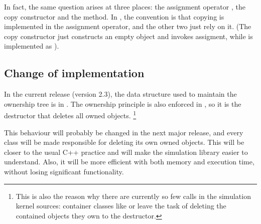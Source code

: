 In fact, the same question arises at three places:
the assignment operator , the copy constructor
and the  method.
In {\opp}, the convention is that copying is implemented
in the assignment operator, and the other two just rely on it.
(The copy constructor just constructs an empty object and
invokes assigment, while 
is implemented as ).

%
%
%
%
%
%
%
%
%

\subsection{Change of implementation}

In the current release (version 2.3), the data structure
used to maintain the ownership tree is in .
The ownership principle is also enforced in ,
so it is the  destructor that deletes all owned objects.
  \footnote{This is also the reason why there are currently so few
   calls in the simulation kernel sources:
  container classes like  or 
  leave the task of deleting the contained objects they own to the
   destructor.}

This behaviour will probably be changed in the next major release,
and every class will be made responsible for deleting its own owned
objects. This will be closer to the usual C++ practice and will
make the {\opp} simulation library easier to understand. Also, it
will be more efficient with both memory and execution time, without
losing significant functionality.

